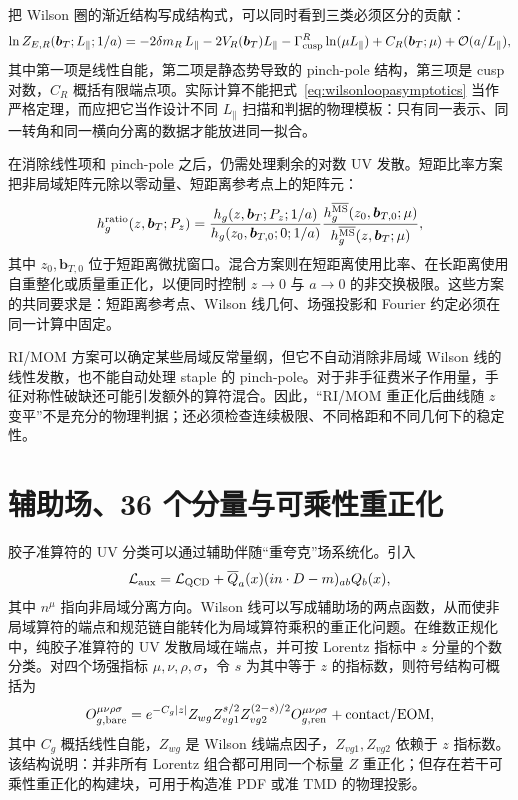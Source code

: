 \documentclass[UTF8,12pt,a4paper,twoside,openany]{ctexbook}
\newcommand{\MSbar}{\overline{\mathrm{MS}}}
\newcommand{\bT}{\boldsymbol b_T}
\begin{document}
把 Wilson 圈的渐近结构写成结构式，可以同时看到三类必须区分的贡献：
\begin{equation}
  \ln Z_{E,R}(\bT;L_\parallel;1/a)
  =-2\delta m_R\,L_\parallel
  -2V_R(\bT)L_\parallel
  -\Gamma^{R}_{\rm cusp}\ln(\mu L_\parallel)
  +C_R(\bT;\mu)
  +\mathcal O(a/L_\parallel),
  \label{eq:wilsonloopasymptotics}
\end{equation}
其中第一项是线性自能，第二项是静态势导致的 pinch-pole 结构，第三项是 cusp 对数，\(C_R\) 概括有限端点项。实际计算不能把式~\eqref{eq:wilsonloopasymptotics} 当作严格定理，而应把它当作设计不同 \(L_\parallel\) 扫描和判据的物理模板：只有同一表示、同一转角和同一横向分离的数据才能放进同一拟合。

在消除线性项和 pinch-pole 之后，仍需处理剩余的对数 UV 发散。短距比率方案把非局域矩阵元除以零动量、短距离参考点上的矩阵元：
\begin{equation}
  h^{\rm ratio}_g(z,\bT;P_z)
  =
  \frac{h_g(z,\bT;P_z;1/a)}
  {h_g(z_0,\boldsymbol b_{T,0};0;1/a)}
  \frac{h_g^{\MSbar}(z_0,\boldsymbol b_{T,0};\mu)}
  {h_g^{\MSbar}(z,\bT;\mu)},
  \label{eq:ratioscheme}
\end{equation}
其中 \(z_0,\boldsymbol b_{T,0}\) 位于短距离微扰窗口。混合方案则在短距离使用比率、在长距离使用自重整化或质量重正化，以便同时控制 \(z\to0\) 与 \(a\to0\) 的非交换极限\cite{JiHybrid2021,Huo2021}。这些方案的共同要求是：短距离参考点、Wilson 线几何、场强投影和 Fourier 约定必须在同一计算中固定。

RI/MOM 方案可以确定某些局域反常量纲，但它不自动消除非局域 Wilson 线的线性发散，也不能自动处理 staple 的 pinch-pole。对于非手征费米子作用量，手征对称性破缺还可能引发额外的算符混合。因此，“RI/MOM 重正化后曲线随 \(z\) 变平”不是充分的物理判据；还必须检查连续极限、不同格距和不同几何下的稳定性\cite{Huo2021,Ishikawa2017}。

\section{辅助场、36 个分量与可乘性重正化}

胶子准算符的 UV 分类可以通过辅助伴随“重夸克”场系统化。引入
\begin{equation}
  \mathcal L_{\rm aux}
  =\mathcal L_{\rm QCD}
  +\overline Q_a(x)(in\cdot D-m)_{ab}Q_b(x),
  \label{eq:auxiliarylagrangian}
\end{equation}
其中 \(n^\mu\) 指向非局域分离方向。Wilson 线可以写成辅助场的两点函数，从而使非局域算符的端点和规范链自能转化为局域算符乘积的重正化问题\cite{ZhangGluonLaMET2019}。在维数正规化中，纯胶子准算符的 UV 发散局域在端点，并可按 Lorentz 指标中 \(z\) 分量的个数分类。对四个场强指标 \(\mu,\nu,\rho,\sigma\)，令 \(s\) 为其中等于 \(z\) 的指标数，则符号结构可概括为
\begin{equation}
  O^{\mu\nu\rho\sigma}_{g,\rm bare}
  =e^{-C_g|z|}
  Z_{wg}Z_{vg1}^{s/2}Z_{vg2}^{(2-s)/2}
  O^{\mu\nu\rho\sigma}_{g,\rm ren}
  +\text{contact/EOM},
  \label{eq:multiplicativegluon}
\end{equation}
其中 \(C_g\) 概括线性自能，\(Z_{wg}\) 是 Wilson 线端点因子，\(Z_{vg1},Z_{vg2}\) 依赖于 \(z\) 指标数。该结构说明：并非所有 Lorentz 组合都可用同一个标量 \(Z\) 重正化；但存在若干可乘性重正化的构建块，可用于构造准 PDF 或准 TMD 的物理投影\cite{LiMaQiu2019,ZhangGluonLaMET2019}。
\end{document}
